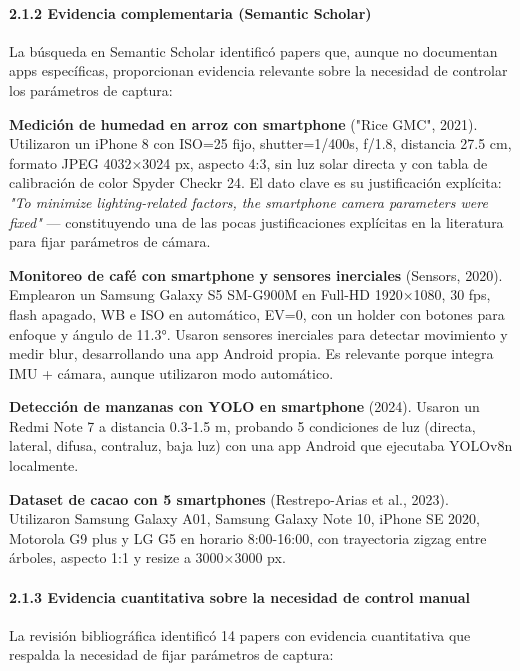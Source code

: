 \paragraph{2.1.2 Evidencia complementaria (Semantic Scholar)}


La búsqueda en Semantic Scholar identificó papers que, aunque no documentan apps específicas, proporcionan evidencia relevante sobre la necesidad de controlar los parámetros de captura:


\textbf{Medición de humedad en arroz con smartphone} ("Rice GMC", 2021). Utilizaron un iPhone 8 con ISO=25 fijo, shutter=1/400s, f/1.8, distancia 27.5 cm, formato JPEG 4032×3024 px, aspecto 4:3, sin luz solar directa y con tabla de calibración de color Spyder Checkr 24. El dato clave es su justificación explícita: \textit{"To minimize lighting-related factors, the smartphone camera parameters were fixed"} — constituyendo una de las pocas justificaciones explícitas en la literatura para fijar parámetros de cámara.


\textbf{Monitoreo de café con smartphone y sensores inerciales} (Sensors, 2020). Emplearon un Samsung Galaxy S5 SM-G900M en Full-HD 1920×1080, 30 fps, flash apagado, WB e ISO en automático, EV=0, con un holder con botones para enfoque y ángulo de 11.3°. Usaron sensores inerciales para detectar movimiento y medir blur, desarrollando una app Android propia. Es relevante porque integra IMU + cámara, aunque utilizaron modo automático.


\textbf{Detección de manzanas con YOLO en smartphone} (2024). Usaron un Redmi Note 7 a distancia 0.3-1.5 m, probando 5 condiciones de luz (directa, lateral, difusa, contraluz, baja luz) con una app Android que ejecutaba YOLOv8n localmente.


\textbf{Dataset de cacao con 5 smartphones} (Restrepo-Arias et al., 2023). Utilizaron Samsung Galaxy A01, Samsung Galaxy Note 10, iPhone SE 2020, Motorola G9 plus y LG G5 en horario 8:00-16:00, con trayectoria zigzag entre árboles, aspecto 1:1 y resize a 3000×3000 px.


\paragraph{2.1.3 Evidencia cuantitativa sobre la necesidad de control manual}


La revisión bibliográfica identificó 14 papers con evidencia cuantitativa que respalda la necesidad de fijar parámetros de captura:



